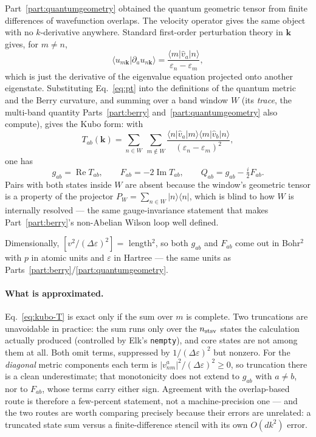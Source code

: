 \documentclass[11pt]{article}
\begin{document}
Part~\ref{part:quantumgeometry} obtained the quantum geometric tensor from finite
differences of wavefunction overlaps. The velocity operator gives the same object with no
$k$-derivative anywhere. Standard first-order perturbation theory in $\mathbf k$ gives,
for $m\neq n$,
\begin{equation}
  \langle u_{m\mathbf k}|\partial_a u_{n\mathbf k}\rangle
  = \frac{\langle m|\hat v_a|n\rangle}{\varepsilon_n-\varepsilon_m},
  \label{eq:pt}
\end{equation}
which is just the derivative of the eigenvalue equation projected onto another
eigenstate. Substituting Eq.~\eqref{eq:pt} into the definitions of the quantum metric and
the Berry curvature, and summing over a band window $W$ (its \emph{trace}, the multi-band
quantity Parts~\ref{part:berry} and~\ref{part:quantumgeometry} also compute), gives the
Kubo form: with
\begin{equation}
  T_{ab}(\mathbf k) = \sum_{n\in W}\ \sum_{m\notin W}
    \frac{\langle n|\hat v_a|m\rangle\langle m|\hat v_b|n\rangle}
         {(\varepsilon_n-\varepsilon_m)^2},
  \label{eq:kubo-T}
\end{equation}
one has
\begin{equation}
  g_{ab} = \operatorname{Re}T_{ab},\qquad
  F_{ab} = -2\operatorname{Im}T_{ab},\qquad
  Q_{ab} = g_{ab} - \tfrac i2 F_{ab}.
  \label{eq:kubo-geometry}
\end{equation}
Pairs with both states inside $W$ are absent because the window's geometric tensor is a
property of the projector $P_W=\sum_{n\in W}|n\rangle\langle n|$, which is blind to how
$W$ is internally resolved --- the same gauge-invariance statement that makes
Part~\ref{part:berry}'s non-Abelian Wilson loop well defined.

Dimensionally, $[v^2/(\Delta\varepsilon)^2]=$ length$^2$, so both $g_{ab}$ and $F_{ab}$
come out in Bohr$^2$ with $p$ in atomic units and $\varepsilon$ in Hartree --- the same
units as Parts~\ref{part:berry}/\ref{part:quantumgeometry}.

\paragraph{What is approximated.} Eq.~\eqref{eq:kubo-T} is exact only if the sum over $m$
is complete. Two truncations are unavoidable in practice: the sum runs only over the
$n_{\rm stsv}$ states the calculation actually produced (controlled by Elk's
\texttt{nempty}), and core states are not among them at all. Both omit terms, suppressed
by $1/(\Delta\varepsilon)^2$ but nonzero. For the \emph{diagonal} metric components each
term is $|v^a_{nm}|^2/(\Delta\varepsilon)^2\geq0$, so truncation there is a clean
underestimate; that monotonicity does not extend to $g_{ab}$ with $a\neq b$, nor to
$F_{ab}$, whose terms carry either sign. Agreement with the overlap-based route is
therefore a few-percent statement, not a machine-precision one --- and the two routes are
worth comparing precisely because their errors are unrelated: a truncated state sum
versus a finite-difference stencil with its own $O(dk^2)$ error.
\end{document}
